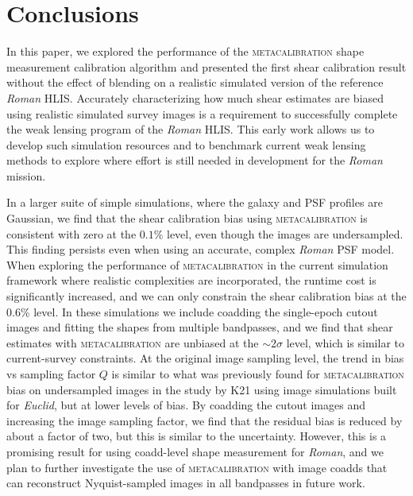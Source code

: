 \documentclass[fleqn,usenatbib]{mnras}
\begin{document}
\section{Conclusions}\label{sec:conclusion}

In this paper, we explored the performance of the \textsc{metacalibration} shape measurement calibration algorithm and presented the first shear calibration result without the effect of blending on a realistic simulated version of the reference \emph{Roman} HLIS. Accurately characterizing how much shear estimates are biased using realistic simulated survey images is a requirement to successfully complete the weak lensing program of the \emph{Roman} HLIS. This early work allows us to develop such simulation resources and to benchmark current weak lensing methods to explore where effort is still needed in development for the \emph{Roman} mission. 

In a larger suite of simple simulations, where the galaxy and PSF profiles are Gaussian, we find that the shear calibration bias using \textsc{metacalibration} is consistent with zero at the $0.1$\% level, even though the images are undersampled. This finding persists even when using an accurate, complex \emph{Roman} PSF model. When exploring the performance of \textsc{metacalibration} in the current simulation framework where realistic complexities are incorporated, the runtime cost is significantly increased, and we can only constrain the shear calibration bias at the $0.6$\% level. In these simulations we include coadding the single-epoch cutout images and fitting the shapes from multiple bandpasses, and we find that shear estimates with \textsc{metacalibration} are unbiased at the $\sim 2\sigma$ level, which is similar to current-survey constraints. At the original image sampling level, the trend in bias vs sampling factor $Q$ is similar to what was previously found for \textsc{metacalibration} bias on undersampled images in the study by K21 using image simulations built for \emph{Euclid}, but at lower levels of bias. By coadding the cutout images and increasing the image sampling factor, we find that the residual bias is reduced by about a factor of two, but this is similar to the uncertainty. However, this is a promising result for using coadd-level shape measurement for \emph{Roman}, and we plan to further investigate the use of \textsc{metacalibration} with image coadds that can reconstruct Nyquist-sampled images in all bandpasses in future work.
\end{document}
